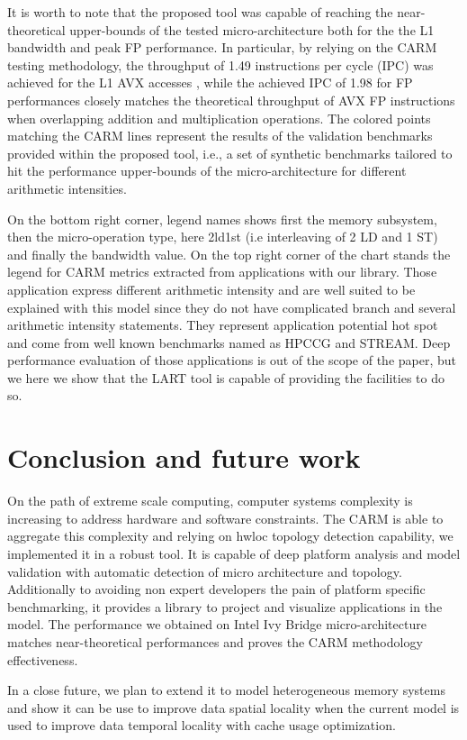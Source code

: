 \documentclass[twoside,twocolumn,8pt]{extarticle}
\begin{document}
It is worth to note that the proposed tool was capable of reaching the near-theoretical upper-bounds of the tested
micro-architecture both for the the L1 bandwidth and peak FP performance.  In particular, by relying on the CARM testing
methodology,  the throughput of 1.49 instructions per cycle (IPC) was achieved for the  L1 AVX accesses , while the achieved IPC of
1.98 for FP performances closely matches the theoretical throughput of AVX FP instructions when overlapping addition and
multiplication operations. 
The colored points matching the CARM lines represent the results of the validation benchmarks provided within the proposed tool,
i.e., a set of synthetic benchmarks tailored to hit the performance upper-bounds of the micro-architecture for different
arithmetic intensities.

On the bottom right corner, legend names shows first the memory subsystem, then the micro-operation type, here 2ld1st (i.e
interleaving of 2 LD and 1 ST) and finally the bandwidth value.
On the top right corner of the chart stands the legend for CARM metrics extracted from applications with our library. Those
application express different arithmetic intensity and are well suited to be explained with this model since they do not have
complicated branch and several arithmetic intensity statements. They represent application potential hot spot and come from well
known benchmarks named as HPCCG and STREAM. Deep performance evaluation of those applications is out of the scope of the paper, but
we here we show that the LART tool is capable of providing the facilities to do so.

\section{Conclusion and future work}\label{sec:conclusion}

On the path of extreme scale computing, computer systems complexity is increasing to address hardware and software constraints.
The CARM is able to aggregate this complexity and relying on hwloc topology detection capability, we implemented it in a robust
tool. It is capable of deep platform analysis and model validation with automatic detection of micro architecture and topology.
Additionally to avoiding non expert developers the pain of platform specific benchmarking, it provides a library to project and
visualize applications in the model. The performance we obtained on Intel Ivy Bridge micro-architecture matches near-theoretical
performances and proves the CARM methodology effectiveness.

In a close future, we plan to extend it to model heterogeneous memory systems and show it can be use to improve data spatial
locality when the current model is used to improve data temporal locality with cache usage optimization.



\end{document}
